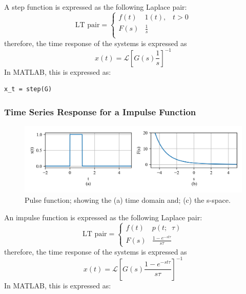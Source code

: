 \documentclass[12pt,letter]{article}
\numberwithin{ex}{section} %
\numberwithin{re}{section} %
\newcommand{\Laplace}[1]{\ensuremath{\mathcal{L}{\left[#1\right]}}}
\numberwithin{equation}{section}	%
\begin{document}
A step function is expressed as the following Laplace pair:
		\begin{equation}
		\text{LT pair} =
			\begin{cases}
			f(t) & 1(t) , \; \; \; t>0 \\
			F(s) & \frac{1}{s} \\
			\end{cases}
		\end{equation}
therefore, the time response of the systems is expressed as
\begin{equation}
x(t) = \Laplace{G(s) \frac{1}{s}}^{-1}
\end{equation}
In MATLAB, this is expressed as:

\lstset{linewidth=5.8in}
\begin{minipage}{1\textwidth}
  \begin{center}
\begin{lstlisting}
x_t = step(G)
\end{lstlisting}
  \end{center}
\end{minipage}

\subsubsection{Time Series Response for a Impulse Function}



		\begin{figure}[H]
			\centering
			\includegraphics[width=6.5in]{../figures/T_and_S_pulse_function}
			\caption{Pulse function; showing the (a) time domain and; (c) the s-space.}
			\label{fig:Laplace_pulse_transform}
		\end{figure}


An impulse function is expressed as the following Laplace pair:
		\begin{equation}
		\text{LT pair} =
			\begin{cases}
			f(t) & p(t; \; \; \tau) \\
			F(s) & \frac{1-e^{-st\tau}}{s \tau}
			\end{cases}
		\end{equation}
therefore, the time response of the systems is expressed as
\begin{equation}
x(t) = \Laplace{G(s) \frac{1-e^{-st\tau}}{s \tau}}^{-1}
\end{equation}
In MATLAB, this is expressed as:
\end{document}
